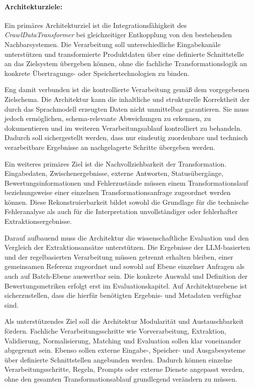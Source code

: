 \paragraph{Architekturziele:}

Ein primäres Architekturziel ist die Integrationsfähigkeit des \textit{CrawlDataTransformer} bei gleichzeitiger Entkopplung von den bestehenden Nachbarsystemen. 
Die Verarbeitung soll unterschiedliche Eingabekanäle unterstützen und transformierte Produktdaten über eine definierte Schnittstelle an das Zielsystem übergeben können, 
ohne die fachliche Transformationslogik an konkrete Übertragungs- oder Speichertechnologien zu binden.

Eng damit verbunden ist die kontrollierte Verarbeitung gemäß dem vorgegebenen Zielschema. Die Architektur kann die inhaltliche und strukturelle Korrektheit der durch das 
Sprachmodell erzeugten Daten nicht unmittelbar garantieren. Sie muss jedoch ermöglichen, schema-relevante Abweichungen zu erkennen, zu dokumentieren und im weiteren 
Verarbeitungsablauf kontrolliert zu behandeln. Dadurch soll sichergestellt werden, dass nur eindeutig zuordenbare und technisch verarbeitbare Ergebnisse an nachgelagerte 
Schritte übergeben werden.

Ein weiteres primäres Ziel ist die Nachvollziehbarkeit der Transformation. Eingabedaten, Zwischenergebnisse, externe Antworten, Statusübergänge, Bewertungsinformationen 
und Fehlerzustände müssen einem Transformationslauf beziehungsweise einer einzelnen Transformationsanfrage zugeordnet werden können. Diese Rekonstruierbarkeit bildet sowohl 
die Grundlage für die technische Fehleranalyse als auch für die Interpretation unvollständiger oder fehlerhafter Extraktionsergebnisse.

Darauf aufbauend muss die Architektur die wissenschaftliche Evaluation und den Vergleich der Extraktionsansätze unterstützen. Die Ergebnisse der LLM-basierten und der 
regelbasierten Verarbeitung müssen getrennt erhalten bleiben, einer gemeinsamen Referenz zugeordnet und sowohl auf Ebene einzelner Anfragen als auch auf Batch-Ebene 
auswertbar sein. Die konkrete Auswahl und Definition der Bewertungsmetriken erfolgt erst im Evaluationskapitel. Auf Architekturebene ist sicherzustellen, dass die hierfür 
benötigten Ergebnis- und Metadaten verfügbar sind.

Als unterstützendes Ziel soll die Architektur Modularität und Austauschbarkeit fördern. Fachliche Verarbeitungsschritte wie Vorverarbeitung, Extraktion, Validierung, 
Normalisierung, Matching und Evaluation sollen klar voneinander abgegrenzt sein. Ebenso sollen externe Eingabe-, Speicher- und Ausgabesysteme über definierte Schnittstellen 
angebunden werden. Dadurch können einzelne Verarbeitungsschritte, Regeln, Prompts oder externe Dienste angepasst werden, ohne den gesamten Transformationsablauf 
grundlegend verändern zu müssen.

